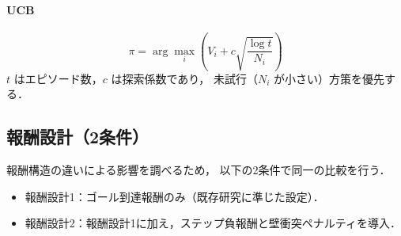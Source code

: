 \paragraph{UCB}
\begin{equation}
\pi=\arg\max_i\left( V_i + c\sqrt{\frac{\log t}{N_i}} \right)
\end{equation}
$ t $ はエピソード数，$c$ は探索係数であり，
未試行（$N_i$ が小さい）方策を優先する．

\subsection{報酬設計（2条件）}
報酬構造の違いによる影響を調べるため，
以下の2条件で同一の比較を行う．
\begin{itemize}
  \item 報酬設計1：ゴール到達報酬のみ（既存研究に準じた設定）．
  \item 報酬設計2：報酬設計1に加え，ステップ負報酬と壁衝突ペナルティを導入．
\end{itemize}
